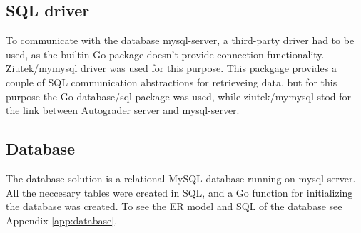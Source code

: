 \subsection{SQL driver}\label{sec:sqldriv}
To communicate with the database mysql-server, a third-party driver had to be used, as the builtin Go package doesn't provide connection functionality. Ziutek/mymysql \cite{ziutek} driver was used for this purpose. This packgage provides a couple of SQL communication abstractions for retrieveing data, but for this purpose the Go database/sql package was used, while ziutek/mymysql stod for the link between Autograder server and mysql-server. 

\subsection{Database}\label{sec:database}
The database solution is a relational MySQL database running on mysql-server. All the neccesary tables were created in SQL, and a Go function for initializing the database was created. To see the ER model and SQL of the database see Appendix \ref{app:database}. 

